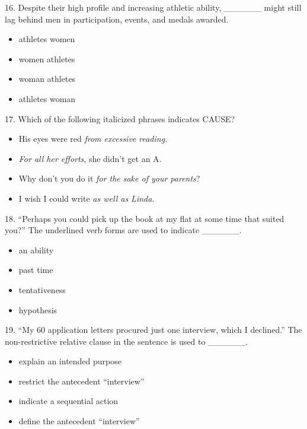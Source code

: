 \documentclass[UTF8,11pt]{ctexart}
\begin{document}
16. Despite their high profile and increasing athletic ability, \_\_\_\_\_\_ might still lag behind men in participation, events, and medals awarded.


\begin{itemize}[leftmargin=2em,itemsep=.2em,topsep=.4em]\item[A.] athletes women
\item[B.] women athletes
\item[C.] woman athletes
\item[D.] athletes woman
\end{itemize}

17. Which of the following italicized phrases indicates CAUSE?


\begin{itemize}[leftmargin=2em,itemsep=.2em,topsep=.4em]\item[A.] His eyes were red \textit{from excessive reading}.
\item[B.] \textit{For all her efforts}, she didn’t get an A.
\item[C.] Why don’t you do it \textit{for the sake of your parents}?
\item[D.] I wish I could write \textit{as well as Linda}.
\end{itemize}

18. “Perhaps you could pick up the book at my flat at some time that suited you?” The underlined verb forms are used to indicate \_\_\_\_\_\_.


\begin{itemize}[leftmargin=2em,itemsep=.2em,topsep=.4em]\item[A.] an ability
\item[B.] past time
\item[C.] tentativeness
\item[D.] hypothesis
\end{itemize}

19. “My 60 application letters procured just one interview, which I declined.” The non-restrictive relative clause in the sentence is used to \_\_\_\_\_\_.


\begin{itemize}[leftmargin=2em,itemsep=.2em,topsep=.4em]\item[A.] explain an intended purpose
\item[B.] restrict the antecedent “interview”
\item[C.] indicate a sequential action
\item[D.] define the antecedent “interview”
\end{itemize}
\end{document}
